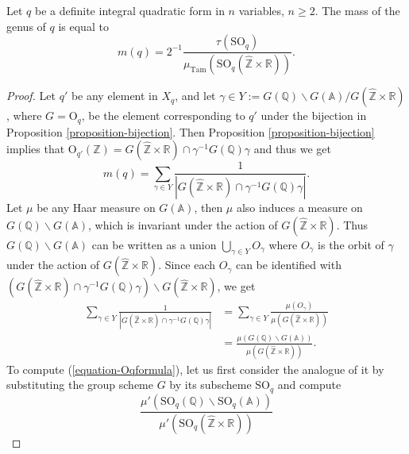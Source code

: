 \begin{proposition}
\label{proposition-SMSmassformula}
Let $q$ be a definite integral quadratic form in  $n$ variables, $n\geq 2$. The mass of the genus of $q$ is equal to 
\[
	m(q)=2^{-1}\frac{\tau(\text{SO}_q)}{\mu_{\text{Tam}}(\text{SO}_{q}(\hat{\mathbb{Z}}\times \mathbb{R}))}.
\]  
\end{proposition}
\begin{proof}
	Let $q'$ be any element in $X_q$, and let $\gamma\in Y:=G(\mathbb{Q})\backslash G(\mathbb{A})/G(\hat{\mathbb{Z}}\times \mathbb{R})$, where $G=\text{O}_q$, be the element corresponding to $q'$ under the bijection in Proposition \ref{proposition-bijection}. Then Proposition \ref{proposition-bijection} implies that $\text{O}_{q'}(\mathbb{Z})=G(\hat{\mathbb{Z}}\times \mathbb{R})\cap \gamma^{-1}G(\mathbb{Q})\gamma$ and thus we get 
	\begin{equation*}
		m(q)=\sum_{\gamma\in Y} \frac{1}{|G(\hat{\mathbb{Z}}\times \mathbb{R})\cap \gamma^{-1}G(\mathbb{Q})\gamma|}.
	\end{equation*}
	Let $\mu$ be any Haar measure on $G(\mathbb{A})$, then $\mu$ also induces a measure on $G(\mathbb{Q})\backslash G(\mathbb{A})$, which is invariant under the action of $G(\hat{\mathbb{Z}}\times\mathbb{R})$. Thus $G(\mathbb{Q})\backslash G(\mathbb{A})$ can be written as a union $\bigcup_{\gamma\in Y} O_{\gamma}$ where $O_{\gamma}$ is the orbit of $\gamma$ under the action of $G(\hat{\mathbb{Z}}\times\mathbb{R})$. Since each $O_{\gamma}$ can be identified with $(G(\hat{\mathbb{Z}}\times \mathbb{R})\cap \gamma^{-1}G(\mathbb{Q})\gamma)\backslash G(\hat{\mathbb{Z}}\times \mathbb{R})$, we get 
	\begin{align}
		\sum_{\gamma\in Y}\frac{1}{|G(\hat{\mathbb{Z}}\times \mathbb{R})\cap \gamma^{-1}G(\mathbb{Q})\gamma|} &= \sum_{\gamma\in Y}\frac{\mu(O_{\gamma})}{\mu(G(\hat{\mathbb{Z}}\times \mathbb{R}))}\\
											      &= \frac{\mu(G(\mathbb{Q})\backslash G(\mathbb{A}))}{\mu(G(\hat{\mathbb{Z}}\times \mathbb{R}))}.\label{equation-Oqformula}
	\end{align}
	To compute (\ref{equation-Oqformula}), let us first consider the analogue of it by substituting the group scheme $G$ by its subscheme $\text{SO}_q$ and compute 
\begin{equation}\label{equation-SOqformula}
	\frac{\mu'(\text{SO}_q(\mathbb{Q})\backslash \text{SO}_q(\mathbb{A}))}{\mu'(\text{SO}_q(\hat{\mathbb{Z}}\times\mathbb{R}))}
\end{equation}

\end{proof}
